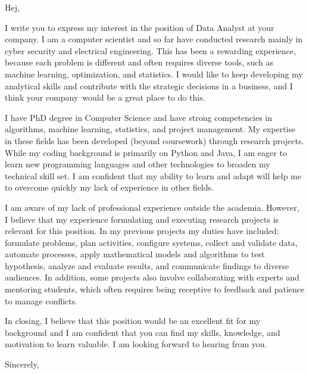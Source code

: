 \documentclass[letter,10pt]{letter}
\newcommand{\position}{Data Analyst }
\newcommand{\place}{your company}
\begin{document}
\begin{letter}{
}
 
\opening{Hej,}

I write you to express my interest in the position of \position  at \place.
I am a computer scientist and so far have conducted research mainly in cyber security and electrical engineering. This has been a rewarding experience, because each problem is different and often requires diverse tools, such as machine learning, optimization, and statistics. 
I would like to keep developing my analytical skills and contribute with the strategic decisions in a business, and I think \place \ would be a great place to do this.


I have PhD degree in Computer Science 
and have strong competencies in algorithms, machine learning, statistics, and project management. My expertise in these fields has been developed (beyond coursework) through research projects. 
While my coding background is primarily on Python and Java, I am eager to learn new programming languages and other technologies to broaden my technical skill set. 
I am confident that my ability to learn and adapt will help me to overcome quickly my lack of experience in other fields.


I am aware of my lack of professional experience outside the academia. However, I believe that my experience formulating and executing research projects is relevant for this position. In my previous projects my duties have included: formulate problems, plan activities, configure systems, collect and validate data, automate processes, apply mathematical models and algorithms to test hypothesis, analyze and evaluate results,  and communicate findings to diverse audiences. In addition, some projects also involve collaborating with experts and mentoring students, which often requires being receptive to feedback and patience to manage conflicts.



In closing, I believe that this position would be an excellent fit for my background and I am confident that you can find my skills, knowledge, and motivation to learn valuable. I am looking forward to hearing from you.


\closing{Sincerely,}



\end{letter}
\end{document}

